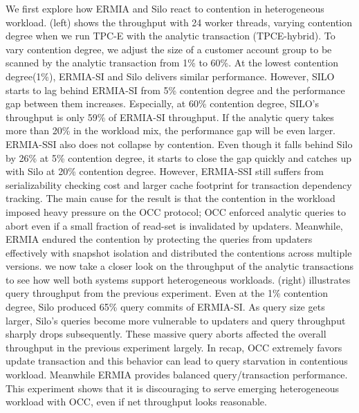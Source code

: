 We first explore how ERMIA and Silo react to contention in heterogeneous workload.  (left) shows the throughput with 24 worker threads, varying contention degree when we run TPC-E with the analytic transaction (TPCE-hybrid). To vary contention degree, we adjust the size of a customer account group to be scanned by the analytic transaction from 1\% to 60\%. At the lowest contention degree(1\%), ERMIA-SI and Silo delivers similar performance. However, SILO starts to lag behind ERMIA-SI from 5\% contention degree and the performance gap between them increases. Especially, at 60\% contention degree, SILO's throughput is only 59\% of ERMIA-SI throughput. If the analytic query takes more than 20\% in the workload mix, the performance gap will be even larger. ERMIA-SSI also does not collapse by contention. Even though it falls behind Silo by 26\% at 5\% contention degree, it starts to close the gap quickly and catches up with Silo at 20\% contention degree. However, ERMIA-SSI still suffers from serializability checking cost and larger cache footprint for transaction dependency tracking.
The main cause for the result is that the contention in the workload imposed heavy pressure on the OCC protocol; OCC enforced analytic queries to abort even if a small fraction of read-set is invalidated by updaters. Meanwhile, ERMIA endured the contention by protecting the queries from updaters effectively with snapshot isolation and distributed the contentions across multiple versions. 
we now take a closer look on the throughput of the analytic transactions to see how well both systems support heterogeneous workloads.  (right) illustrates query throughput from the previous experiment. Even at the 1\% contention degree, Silo produced 65\% query commits of ERMIA-SI. As query size gets larger, Silo's queries become more vulnerable to updaters and query throughput sharply drops subsequently. These massive query aborts affected the overall throughput in the previous experiment largely. In recap, OCC extremely favors update transaction and this behavior can lead to query starvation in contentious workload. Meanwhile ERMIA provides balanced query/transaction performance. This experiment shows that it is discouraging to serve emerging heterogeneous workload with OCC, even if net throughput looks reasonable. 
   
